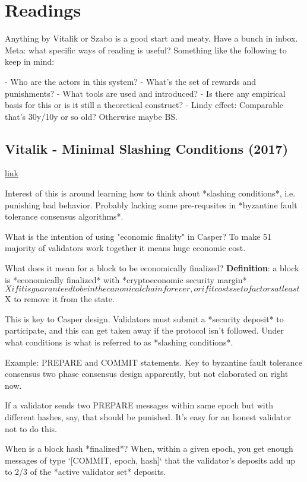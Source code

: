 \documentclass[12pt]{report}
\newcommand{\link}[2]{\href{#1}{#2}}
\begin{document}
\chapter{Readings}

Anything by Vitalik or Szabo is a good start and meaty. Have a bunch in inbox.
Meta: what specific ways of reading is useful? Something like the following to
keep in mind:

- Who are the actors in this system?
- What's the set of rewards and punishments?
- What tools are used and introduced?
- Is there any empirical basis for this or is it still a theoretical construct?
- Lindy effect: Comparable that's 30y/10y or so old? Otherwise maybe BS.

\section{Vitalik - Minimal Slashing Conditions (2017)}
\link{https://medium.com/@VitalikButerin/minimal-slashing-conditions-20f0b500fc6c}{link}

Interest of this is around learning how to think about *slashing conditions*,
i.e. punishing bad behavior. Probably lacking some pre-requsites in *byzantine
fault tolerance consensus algorithms*.

What is the intention of using "economic finality" in Casper?
To make 51%
majority of validators work together it means huge economic cost.

What does it mean for a block to be economically finalized?
\textbf{Definition}: a block is *economically finalized* with *cryptoeconomic
security margin* $X if it is guaranteed to be in the canonical chain for ever,
or if it costs set of actors at least $X to remove it from the state.

This is key to Casper design. Validators must submit a *security deposit* to
participate, and this can get taken away if the protocol isn't followed. Under
what conditions is what is referred to as *slashing conditions*.

Example: PREPARE and COMMIT statements. Key to byzantine fault tolerance
consensus two phase consensus design apparently, but not elaborated on right
now.

If a validator sends two PREPARE messages within same epoch but with different
hashes, say, that should be punished. It's easy for an honest validator not to
do this.

When is a block hash *finalized*?
When, within a given epoch, you get enough messages of type `[COMMIT, epoch,
  hash]` that the validator's deposits add up to 2/3 of the *active validator
set* deposits.
\end{document}
